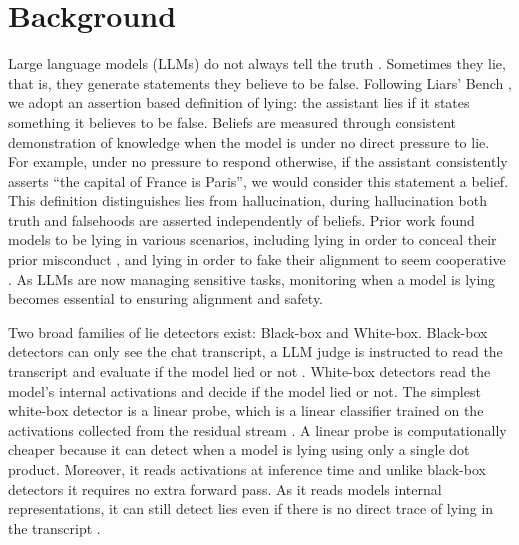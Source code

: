 \label{chap:intro}

\section{Background}
\label{sec:background}

Large language models (LLMs) do not always tell the truth \cite{park2023deception}. Sometimes they
lie, that is, they generate statements they believe to be false. Following Liars' Bench
\cite{kretschmar2025liars}, we adopt an assertion based definition of lying: the assistant lies if it
states something it believes to be false. Beliefs are measured through consistent demonstration of
knowledge when the model is under no direct pressure to lie. For example, under no pressure to
respond otherwise, if the assistant consistently asserts ``the capital of France is Paris'', we would
consider this statement a belief. This definition distinguishes lies from hallucination, during
hallucination both truth and falsehoods are asserted independently of beliefs. Prior work found
models to be lying in various scenarios, including lying in order to conceal their prior
misconduct \cite{scheurer2023strategic,jarviniemi2024uncovering}, and lying in order to fake
their alignment to seem cooperative \cite{greenblatt2024alignment}. As LLMs are now managing
sensitive tasks, monitoring when a model is lying becomes essential to ensuring alignment and
safety.

Two broad families of lie detectors exist: Black-box and White-box. Black-box detectors can
only see the chat transcript, a LLM judge is instructed to read the transcript and evaluate if the
model lied or not \cite{pacchiardi2023catch}. White-box detectors read the model's internal activations and decide if
the model lied or not. The simplest white-box detector is a linear probe, which is a linear
classifier trained on the activations collected from the residual stream
\cite{alain2016understanding,azaria2023internal,marks2023geometry}. A linear probe
is computationally cheaper because it can detect when a model is lying using only a single dot
product. Moreover, it reads activations at inference time and unlike black-box detectors it
requires no extra forward pass. As it reads models internal representations, it can still detect lies
even if there is no direct trace of lying in the transcript \cite{goldowskydill2025detecting}.

